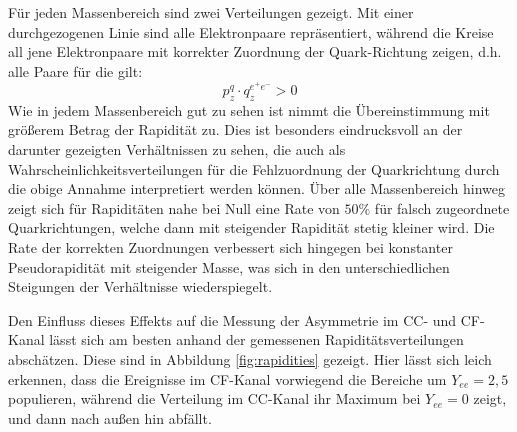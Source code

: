 Für jeden Massenbereich sind zwei Verteilungen gezeigt. Mit einer
durchgezogenen Linie sind alle Elektronpaare repräsentiert, während die Kreise
all jene Elektronpaare mit korrekter Zuordnung der Quark-Richtung zeigen, d.h.
alle Paare für die gilt:
\begin{equation}
    p_z^q \cdot q_z^{e^+e^-} > 0
\end{equation}
Wie in jedem Massenbereich gut zu sehen ist nimmt die Übereinstimmung mit
größerem Betrag der Rapidität zu. Dies ist besonders eindrucksvoll an der
darunter gezeigten Verhältnissen zu sehen, die auch als
Wahrscheinlichkeitsverteilungen für die Fehlzuordnung der Quarkrichtung durch
die obige Annahme interpretiert werden können. Über alle Massenbereich hinweg
zeigt sich für Rapiditäten nahe bei Null eine Rate von $50\%$ für falsch
zugeordnete Quarkrichtungen, welche dann mit steigender Rapidität stetig
kleiner wird. Die Rate der korrekten Zuordnungen verbessert sich hingegen bei
konstanter Pseudorapidität mit steigender Masse, was sich in den
unterschiedlichen Steigungen der Verhältnisse wiederspiegelt.
 
Den Einfluss dieses Effekts auf die Messung der Asymmetrie im \ac{CC}- und
\ac{CF}-Kanal lässt sich am besten anhand der gemessenen Rapiditätsverteilungen
abschätzen. Diese sind in Abbildung \ref{fig:rapidities} gezeigt. Hier lässt
sich leich erkennen, dass die Ereignisse im \ac{CF}-Kanal vorwiegend die
Bereiche um $Y_{ee}=2,5$ populieren, während die Verteilung im \ac{CC}-Kanal
ihr Maximum bei $Y_{ee}=0$ zeigt, und dann nach außen hin abfällt.

